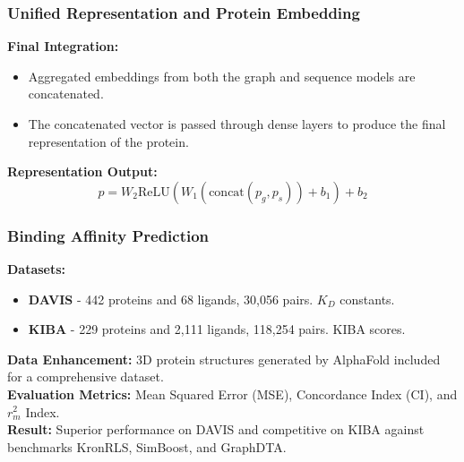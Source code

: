 \documentclass[11pt,xcolor={dvipsnames},hyperref={pdftex,pdfpagemode=UseNone,hidelinks,pdfdisplaydoctitle=true},usepdftitle=false]{beamer}
\begin{document}
\begin{frame}
\frametitle{Unified Representation and Protein Embedding}
\textbf{Final Integration:}
\begin{itemize}
    \item Aggregated embeddings from both the graph and sequence models are concatenated.
    \item The concatenated vector is passed through dense layers to produce the final representation of the protein.
\end{itemize}

\textbf{Representation Output:}
\begin{equation*}
    p = W_2 \text{ReLU}(W_1 (\text{concat}(p_g, p_s)) + b_1) + b_2
\end{equation*}

\end{frame}



\begin{frame}
\frametitle{Binding Affinity Prediction}
\textbf{Datasets:}
\begin{itemize}
    \item \textbf{DAVIS} - 442 proteins and 68 ligands, 30,056 pairs. $K_D$ constants.
    \item \textbf{KIBA} - 229 proteins and 2,111 ligands, 118,254 pairs. KIBA scores.
\end{itemize}
\textbf{Data Enhancement:} 3D protein structures generated by AlphaFold included for a comprehensive dataset. \\
\textbf{Evaluation Metrics:} Mean Squared Error (MSE), Concordance Index (CI), and $r_m ^ 2$ Index. \\
\textbf{Result:} Superior performance on DAVIS and competitive on KIBA against benchmarks KronRLS, SimBoost, and GraphDTA.

\end{frame}
\end{document}
